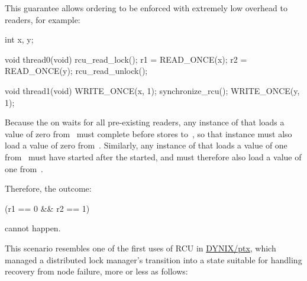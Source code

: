 This guarantee allows ordering to be enforced with extremely low
overhead to readers, for example:

\begin{fcvlabel}
\begin{VerbatimN}[commandchars=\%\@\$]
	int x, y;

	void thread0(void)
	{
		rcu_read_lock();
		r1 = READ_ONCE(x);
		r2 = READ_ONCE(y);
		rcu_read_unlock();
	}

	void thread1(void)
	{
		WRITE_ONCE(x, 1);
		synchronize_rcu(); %
		WRITE_ONCE(y, 1);
	}
\end{VerbatimN}
\end{fcvlabel}

\begin{fcvref}
Because the  on  %
waits for all pre-existing
readers, any instance of  that loads a value of zero
from~ must complete before  stores to~, so that
instance must also load a value of zero from~.
Similarly, any
instance of  that loads a value of one from~ must have
started after the  started, and must therefore also
load a value of one from~.
\end{fcvref}
Therefore, the outcome:

\begin{VerbatimU}
	(r1 == 0 && r2 == 1)
\end{VerbatimU}

\noindent%
cannot happen.

\QuickQuizEnd

This scenario resembles one of the first uses of RCU in
\href{https://en.wikipedia.org/wiki/DYNIX}{DYNIX/ptx}, which managed a
distributed lock manager's transition into a state suitable for handling
recovery from node failure, more or less as follows:

